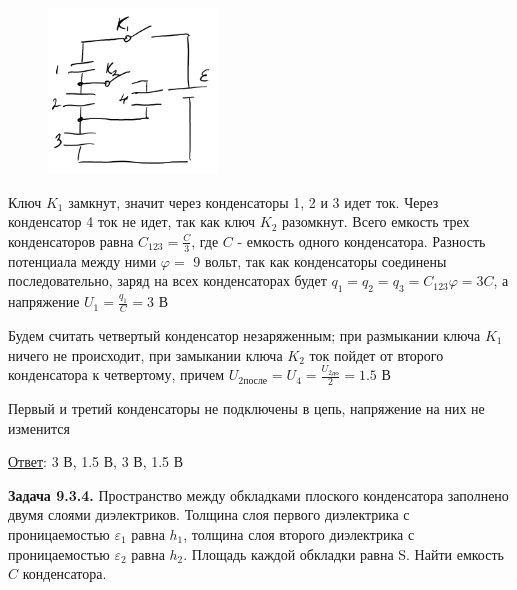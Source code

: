 \documentclass[12pt]{article}
\begin{document}
\begin{minipage}{\textwidth}
    \begin{figure}
        \includegraphics[width=0.4\textwidth]{physics1/images/physics1_homework_8_2}
    \end{figure}

    Ключ $K_1$ замкнут, значит через конденсаторы 1, 2 и 3 идет ток. Через конденсатор 4 ток не идет, так как ключ $K_2$ разомкнут.
    Всего емкость трех конденсаторов равна $C_{123} = \frac{C}{3}$, где $C$ - емкость одного конденсатора. Разность потенциала между ними $\varphi =$ 9 вольт,
    так как конденсаторы соединены последовательно, заряд на всех конденсаторах будет $q_1 = q_2 = q_3 = C_{123} \varphi = 3C$,
    а напряжение $U_1 = \frac{q_1}{C} = 3$ В
    
    Будем считать четвертый конденсатор незаряженным; при размыкании ключа $K_1$ ничего не происходит, при замыкании ключа $K_2$ ток пойдет
    от второго конденсатора к четвертому, причем $U_{2\text{после}} = U_{4} = \frac{U_{2\text{до}}}{2} = 1.5$ В

    Первый и третий конденсаторы не подключены в цепь, напряжение на них не изменится
\end{minipage}

\bigvspace

\underline{Ответ}: 3 В, 1.5 В, 3 В, 1.5 В

\begin{tcolorbox}
    \textbf{Задача 9.3.4.} Пространство между
    обкладками плоского конденсатора заполнено двумя
    слоями диэлектриков. Толщина слоя первого диэлектрика с
    проницаемостью $\varepsilon_1$ равна $h_1$, толщина
    слоя второго диэлектрика с проницаемостью $\varepsilon_2$ равна $h_2$. 
    Площадь каждой обкладки равна S. Найти емкость $C$ конденсатора.
\end{tcolorbox}
\end{document}
